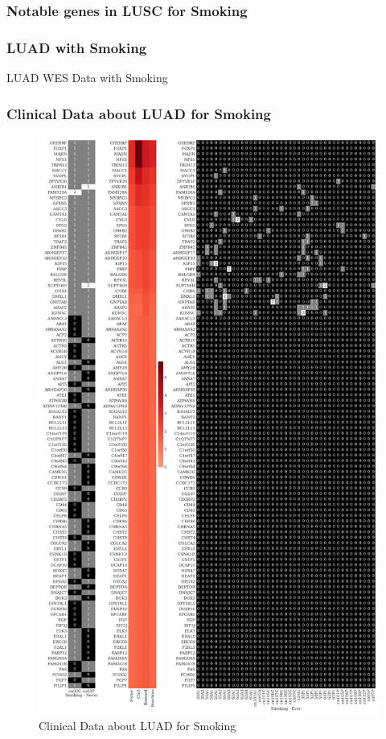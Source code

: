 \documentclass{beamer}
\begin{document}
    \begin{frame}[allowframebreaks]
        \frametitle{Notable genes in LUSC for Smoking}
    \end{frame}

    \begin{frame}
        \frametitle{LUAD with Smoking}

        \begin{table}
            \caption{LUAD WES Data with Smoking}
            \resizebox{!}{0.3 \textheight}
            {}
        \end{table}
    \end{frame}

    \begin{frame}[allowframebreaks]
        \frametitle{Clinical Data about LUAD for Smoking}

        \begin{figure}
            \includegraphics[height=0.6 \textheight]{figures/GeneClinical/BWA-ADC.Smoking.pdf}
            \caption{Clinical Data about LUAD for Smoking}
        \end{figure}


\end{frame}
\end{document}
